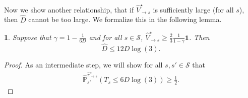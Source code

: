 \documentclass{article}
\theoremstyle{plain}
\theoremstyle{plain}
\newtheorem{lem}[thm]{\protect\lemmaname}
\theoremstyle{remark}
\theoremstyle{plain}
\theoremstyle{plain}
\providecommand{\lemmaname}{Lemma}
\renewcommand{\P}{\mathbb{P}}
\newcommand{\Vhat}{\widehat{V}}
\newcommand{\pihstar}{\widehat{\pi}^\star}
\newcommand{\one}{\mathbf{1}}
\renewcommand{\S}{\mathcal{S}}
\begin{document}
    Now we show another relationship, that if $\Vhat^\star_{\to s}$ is sufficiently large (for all $s$), then $\widehat{D}$ cannot be too large. We formalize this in the following lemma.
    \begin{lem}
    \label{lem:diameter_bound_alg}
        Suppose that $\gamma = 1-\frac{1}{6D}$ and for all $s \in \S$, $\Vhat_{\to s}^\star \geq \frac{2}{3}\frac{1}{1-\gamma}\one $. Then 
        \[
        \widehat{D} \leq 12 D \log(3).
        \]
    \end{lem}
    \begin{proof}
        As an intermediate step, we will show for all $s,s' \in \S$ that
        \begin{align}
            \widehat{\P}_{s'}^{\pihstar_{\to s}}\left(T_{s} \leq 6 D \log( 3)\right) \geq \frac{1}{2}. \label{eq:reaching_prob_lower_bound}
        \end{align}
    

\end{proof}
\end{document}
